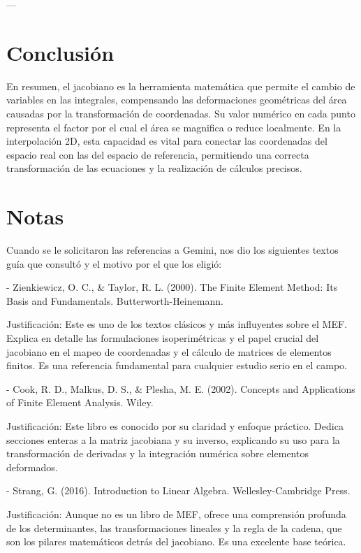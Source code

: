 \documentclass{article}
\begin{document}
---

\section*{Conclusión}
En resumen, el jacobiano es la herramienta matemática que permite el cambio de variables en las integrales, compensando las deformaciones geométricas del área causadas por la transformación de coordenadas. Su valor numérico en cada punto representa el factor por el cual el área se magnifica o reduce localmente. En la interpolación 2D, esta capacidad es vital para conectar las coordenadas del espacio real con las del espacio de referencia, permitiendo una correcta transformación de las ecuaciones y la realización de cálculos precisos.
\section*{Notas}
Cuando se le solicitaron las referencias a Gemini, nos dio los siguientes textos guía que consultó y el motivo por el que los eligió:

- Zienkiewicz, O. C., & Taylor, R. L. (2000). The Finite Element Method: Its Basis and Fundamentals. Butterworth-Heinemann.

Justificación: Este es uno de los textos clásicos y más influyentes sobre el MEF. Explica en detalle las formulaciones isoperimétricas y el papel crucial del jacobiano en el mapeo de coordenadas y el cálculo de matrices de elementos finitos. Es una referencia fundamental para cualquier estudio serio en el campo.

- Cook, R. D., Malkus, D. S., & Plesha, M. E. (2002). Concepts and Applications of Finite Element Analysis. Wiley.

Justificación: Este libro es conocido por su claridad y enfoque práctico. Dedica secciones enteras a la matriz jacobiana y su inverso, explicando su uso para la transformación de derivadas y la integración numérica sobre elementos deformados.

- Strang, G. (2016). Introduction to Linear Algebra. Wellesley-Cambridge Press.

Justificación: Aunque no es un libro de MEF, ofrece una comprensión profunda de los determinantes, las transformaciones lineales y la regla de la cadena, que son los pilares matemáticos detrás del jacobiano. Es una excelente base teórica.
\end{document}
